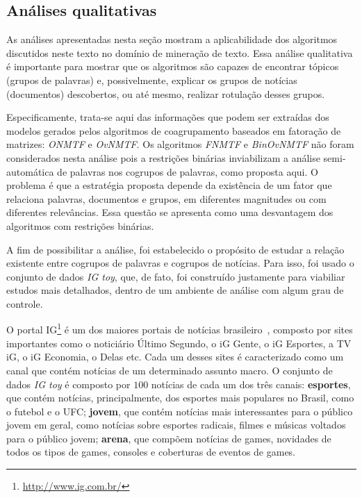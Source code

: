 \documentclass[
    12pt,                %
    oneside,            %
    a4paper,            %
    english,            %
    brazil                %
    ]{abntex2ppgsi}
\begin{document}
\subsection{Análises qualitativas}

As análises apresentadas nesta seção mostram a aplicabilidade dos algoritmos discutidos neste texto no domínio de mineração de texto. Essa análise qualitativa é importante para mostrar que os algoritmos são capazes de encontrar tópicos (grupos de palavras) e, possivelmente, explicar os grupos de notícias (documentos) descobertos, ou até mesmo, realizar rotulação desses grupos.

Especificamente, trata-se aqui das informações que podem ser extraídas dos modelos gerados pelos algoritmos de coagrupamento baseados em fatoração de matrizes: \textit{ONMTF} e \textit{OvNMTF}. Os algoritmos \textit{FNMTF} e \textit{BinOvNMTF} não foram considerados nesta análise pois a restrições binárias inviabilizam a análise semi-automática de palavras nos cogrupos de palavras, como proposta aqui. O problema é que a estratégia proposta depende da existência de um fator que relaciona palavras, documentos e grupos, em diferentes magnitudes ou com diferentes relevâncias. Essa questão se apresenta como uma desvantagem dos algoritmos com restrições binárias.

A fim de possibilitar a análise, foi estabelecido o propósito de estudar a relação existente entre cogrupos de palavras e cogrupos de notícias. Para isso, foi usado o conjunto de dados \textit{IG toy}, que, de fato, foi construído justamente para viabiliar estudos mais detalhados, dentro de um ambiente de análise com algum grau de controle.

O portal IG\footnote{\url{http://www.ig.com.br/}} é um dos maiores portais de notícias brasileiro~\cite{topsites}, composto por sites importantes como o noticiário Último Segundo, o iG Gente, o iG Esportes, a TV iG, o iG Economia, o Delas etc. Cada um desses sites é caracterizado como um canal que contém notícias de um determinado assunto macro. O conjunto de dados \textit{IG toy} é composto por $100$ notícias de cada um dos três canais: \textbf{esportes}, que contém notícias, principalmente, dos esportes mais populares no Brasil, como o futebol e o UFC; \textbf{jovem}, que contém notícias mais interessantes para o público jovem em geral, como notícias sobre esportes radicais, filmes e músicas voltados para o público jovem; \textbf{arena}, que compõem notícias de games, novidades de todos os tipos de games, consoles e coberturas de eventos de games.
\end{document}
